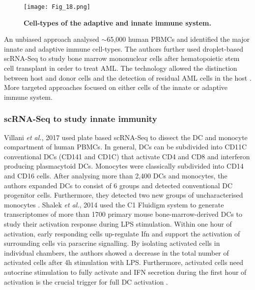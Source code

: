 \begin{figure}[!h]
\centering
\texttt{[image: Fig\_18.png]}
\caption[Cell-types of the adaptive and innate immune system]{\textbf{Cell-types of the adaptive and innate immune system.}}
\label{fig0:immune_system}
\end{figure}

An unbiased approach analysed $\sim$65,000 human \glspl{PBMC} and identified the major innate and adaptive immune cell-types. The authors further used droplet-based scRNA-Seq to study bone marrow mononuclear cells after hematopoietic stem cell transplant in order to treat \gls{AML}. The technology allowed the distinction between host and donor cells and the detection of residual AML cells in the host \citep{Zheng2017}. \\

More targeted approaches focused on either cells of the innate or adaptive immune system.

\subsubsection{scRNA-Seq to study innate immunity}

Villani \emph{et al.}, 2017 used plate based scRNA-Seq to dissect the \gls{DC} and monocyte compartment of human \glspl{PBMC}. In general, DCs can be subdivided into CD11C\plus{} conventional DCs (CD141\plus{} and CD1C\plus{}) that activate CD4\plus{} and CD8\plus{} and interferon producing plasmacytoid DCs. Monocytes were classically subdivided into CD14\plus{} and CD16\plus{} cells. After analysing more than 2,400 DCs and monocytes, the authors expanded DCs to consist of 6 groups and detected conventional DC progenitor cells. Furthermore, they detected two new groups of uncharacterised monocytes \citep{Villani2017}. Shalek \emph{et al.}, 2014 used the C1 Fluidigm system to generate transcriptomes of more than 1700 primary mouse bone-marrow-derived DCs to study their activation response during \gls{LPS} stimulation. Within one hour of activation, early responding cells up-regulate \gls{Ifn}\textbeta{} and support the activation of surrounding cells via paracrine signalling. By isolating activated cells in individual chambers, the authors showed a decrease in the total number of activated cells after 4h stimulation with LPS. Furthermore, activated cells need autocrine stimulation to fully activate and IFN\textbeta{} secretion during the first hour of activation is the crucial trigger for full DC activation \citep{Shalek2014}. \\

